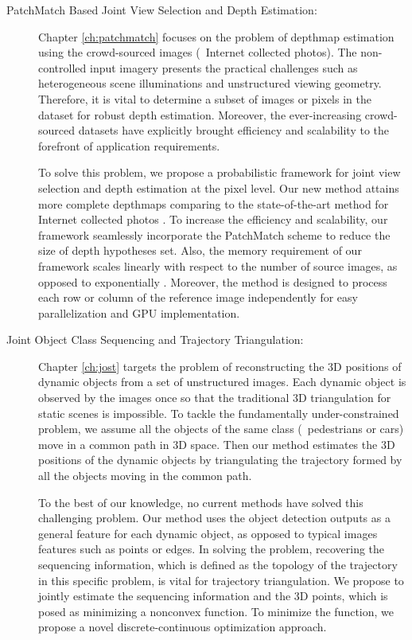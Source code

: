 \begin{description}

\item[PatchMatch Based Joint View Selection and Depth Estimation:]
Chapter \ref{ch:patchmatch} focuses on the problem of depthmap estimation using the crowd-sourced images (\ie~Internet collected photos). The non-controlled input imagery presents the practical challenges such as heterogeneous scene illuminations and unstructured viewing geometry.
Therefore, it is vital to determine a subset of images or pixels in the dataset for robust depth estimation. Moreover, the ever-increasing crowd-sourced datasets have explicitly brought
efficiency and scalability to the forefront of application requirements.

To solve this problem, we propose a probabilistic framework for joint view selection and depth estimation at the pixel level. Our new method attains more complete depthmaps comparing to the state-of-the-art method for Internet collected photos \cite{Goesele07}. 
To increase the efficiency and scalability, our framework seamlessly incorporate the PatchMatch scheme \cite{patchMatchStereo1} to  reduce the size of depth hypotheses set. Also, the memory requirement of our framework scales linearly with respect to the number of source images, as opposed to exponentially \cite{CombinedDepthOutlier}. 
Moreover, the method is designed to process each row or column of the reference image independently for easy parallelization and GPU implementation.

\item[Joint Object Class Sequencing and Trajectory Triangulation:]
Chapter \ref{ch:jost} targets the problem of reconstructing the 3D positions of dynamic objects from a set of unstructured images. Each dynamic object is observed by the images once so that the traditional 3D triangulation for static scenes is impossible. To tackle the fundamentally under-constrained problem, we assume all the objects of the same class (\eg~pedestrians or cars) move in a common path in 3D space. Then our method estimates the 3D positions of the dynamic objects by triangulating the trajectory formed by all the objects moving in the common path. 

To the best of our knowledge, no current methods have solved this challenging problem. 
Our method uses the object detection outputs as a general feature for each dynamic object, as opposed to typical images features such as points or edges. In solving the problem, recovering the sequencing information, which is defined as the topology of the trajectory in this specific problem, is vital for trajectory triangulation. We propose to jointly estimate the sequencing information and the 3D points, which is posed as minimizing a nonconvex function. To minimize the function, we propose a novel discrete-continuous optimization approach. 


\end{description}
